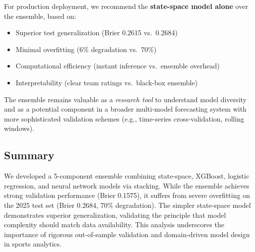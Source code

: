 For production deployment, we recommend the \textbf{state-space model alone} over the ensemble, based on:

\begin{itemize}
    \item Superior test generalization (Brier 0.2615 vs.\ 0.2684)
    \item Minimal overfitting (6\% degradation vs.\ 70\%)
    \item Computational efficiency (instant inference vs.\ ensemble overhead)
    \item Interpretability (clear team ratings vs.\ black-box ensemble)
\end{itemize}

The ensemble remains valuable as a \textit{research tool} to understand model diversity and as a potential component in a broader multi-model forecasting system with more sophisticated validation schemes (e.g., time-series cross-validation, rolling windows).

\subsection{Summary}

We developed a 5-component ensemble combining state-space, XGBoost, logistic regression, and neural network models via stacking. While the ensemble achieves strong validation performance (Brier 0.1575), it suffers from severe overfitting on the 2025 test set (Brier 0.2684, 70\% degradation). The simpler state-space model demonstrates superior generalization, validating the principle that model complexity should match data availability. This analysis underscores the importance of rigorous out-of-sample validation and domain-driven model design in sports analytics.
